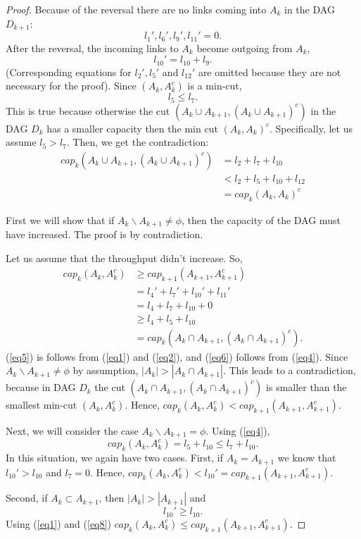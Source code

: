 \documentclass{sig-alternate-2013}
\begin{document}
\begin{proof}
Because of the reversal there are no links coming into $A_k$ in the DAG $D_{k+1}$:
\begin{equation}
l_1',l_6',l_9', l_{11}' = 0 \label{eq2}.
\end{equation}
After the reversal, the incoming links to $A_k$ become outgoing from $A_k$,
\begin{equation}
l_{10}' = l_{10} + l_9 \label{eq3}.
\end{equation}
(Corresponding equations for $l_2', l_5'$ and $l_{12}'$ are omitted because they are not necessary for the proof). Since $(A_k, A_k^c)$ is a min-cut, 
\begin{equation}
l_5 \le l_7. \label{eq4}
\end{equation}
This is true because otherwise the cut $(A_k \cup A_{k+1}, (A_k \cup A_{k+1})^c)$  in the DAG $D_k$ has a smaller capacity then the min cut $(A_k,A_k)^c$. Specifically, let us assume $l_5>l_7$. Then, we get the contradiction: 
\begin{align*}
cap_k(A_k \cup A_{k+1}, (A_k \cup A_{k+1})^c) &= l_2 + l_7 + l_{10}\\
	& < l_2 +l_5 + l_{10} + l_{12} \\
	& = cap_k(A_k, A_k)^c
\end{align*}

First we will show that if $A_k\backslash A_{k+1}\ne \phi$, then the capacity of the DAG must have increased. The proof is by contradiction. 

Let us assume that the throughput didn't increase. So, 
\begin{align}
cap_k(A_k,A_k^c) &\ge cap_{k+1}(A_{k+1},A_{k+1}^c)  \nonumber\\
&=  l_4' + l_7' + l_{10}' + l_{11}'  \nonumber \\
&= l_4 + l_7 + l_{10} + 0  \label{eq5}\\
&\ge l_4 + l_5 + l_{10} \label{eq6}\\
&= cap_k(A_k \cap A_{k+1}, (A_k \cap A_{k+1})^c).
\end{align}
(\ref{eq5}) is follows from (\ref{eq1}) and (\ref{eq2}), and (\ref{eq6}) follows from (\ref{eq4}). Since $A_k\backslash A_{k+1}\ne \phi$ by assumption, $|A_k| > |A_k \cap A_{k+1}|$. This leads to a contradiction, because in DAG $D_k$ the cut $(A_k \cap A_{k+1}, (A_k \cap A_{k+1})^c)$ is smaller than the smallest min-cut $(A_k,A_k^c)$. Hence, $cap_k(A_k,A_k^c) < cap_{k+1}(A_{k+1},A_{k+1}^c)$.

Next, we will consider the case $A_k\backslash A_{k+1} = \phi$. Using (\ref{eq4}),
$$cap_k(A_k,A_k^c) =  l_5+l_{10}\le l_7+l_{10}.$$ In this situation, we again have two cases.
First, if $A_k = A_{k+1}$ we know that $l_{10}' > l_{10}$ and $l_7 = 0$. Hence, $cap_k(A_k,A_k^c) < l_{10}' = cap_{k+1}(A_{k+1}, A_{k+1}^c)$. 

Second, if $A_k \subset A_{k+1}$, then $|A_k| > |A_{k+1}|$ and  
\begin{equation}
l_{10}' \ge l_{10}. \label{eq8}
\end{equation}
Using (\ref{eq1}) and (\ref{eq8}) $cap_k(A_k,A_k^c) \le cap_{k+1}(A_{k+1}, A_{k+1}^c)$.
\end{proof}
\end{document}

